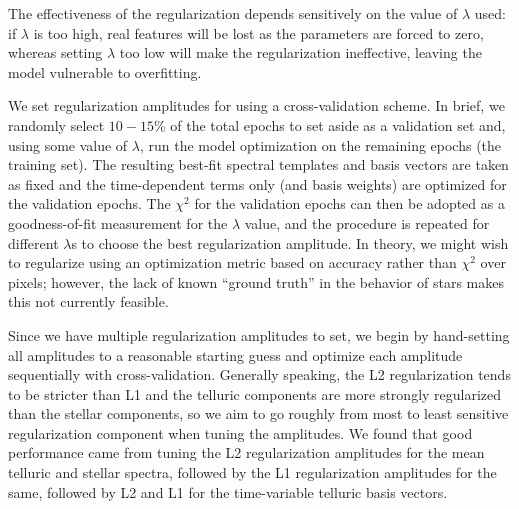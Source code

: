 \documentclass[twocolumn]{aastex62}
\begin{document}
The effectiveness of the regularization depends sensitively on the value of $\lambda$ used: if $\lambda$ is too high, real features will be lost as the parameters are forced to zero, whereas setting $\lambda$ too low will make the regularization ineffective, leaving the model vulnerable to overfitting. 

We set regularization amplitudes for \wobble using a cross-validation scheme. 
In brief, we randomly select $10-15$\% of the total epochs to set aside as a validation set and, using some value of $\lambda$, run the model optimization on the remaining epochs (the training set). 
The resulting best-fit spectral templates and basis vectors are taken as fixed and the time-dependent terms only (\RVs and basis weights) are optimized for the validation epochs. 
The $\chi^2$ for the validation epochs can then be adopted as a goodness-of-fit measurement for the $\lambda$ value, and the procedure is repeated for different $\lambda$s to choose the best regularization amplitude. 
In theory, we might wish to regularize using an optimization metric based on \RV accuracy rather than $\chi^2$ over pixels; however, the lack of known ``ground truth'' in the \RV behavior of stars makes this not currently feasible. 

Since we have multiple regularization amplitudes to set, we begin by hand-setting all amplitudes to a reasonable starting guess and optimize each amplitude sequentially with cross-validation. 
Generally speaking, the L2 regularization tends to be stricter than L1 and the telluric components are more strongly regularized than the stellar components, so we aim to go roughly from most to least sensitive regularization component when tuning the amplitudes.
We found that good performance came from tuning the L2 regularization amplitudes for the mean telluric and stellar spectra, followed by the L1 regularization amplitudes for the same, followed by L2 and L1 for the time-variable telluric basis vectors. 
\end{document}
